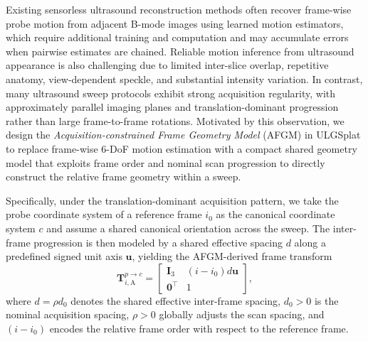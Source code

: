 Existing sensorless ultrasound reconstruction methods often recover
frame-wise probe motion from adjacent B-mode images using learned motion
estimators, which require additional training and computation and may
accumulate errors when pairwise estimates are chained. Reliable motion
inference from ultrasound appearance is also challenging due to limited
inter-slice overlap, repetitive anatomy, view-dependent speckle, and
substantial intensity variation. In contrast, many ultrasound sweep protocols
exhibit strong acquisition regularity, with approximately parallel imaging
planes and translation-dominant progression rather than large frame-to-frame
rotations. Motivated by this observation, we design the
\emph{Acquisition-constrained Frame Geometry Model} (AFGM) in ULGSplat to
replace frame-wise 6-DoF motion estimation with a compact shared geometry
model that exploits frame order and nominal scan progression to directly
construct the relative frame geometry within a sweep.

Specifically, under the translation-dominant acquisition pattern, we take the
probe coordinate system of a reference frame $i_0$ as the canonical coordinate
system $c$ and assume a shared canonical orientation across the sweep. The
inter-frame progression is then modeled by a shared effective spacing $d$
along a predefined signed unit axis $\mathbf u$, yielding the AFGM-derived
frame transform
\begin{equation}
\mathbf T_{i,\mathrm A}^{p\rightarrow c}
=
\begin{bmatrix}
\mathbf I_3 & (i-i_0)d\mathbf u\\
\mathbf 0^\top & 1
\end{bmatrix},
\label{eq:calibration-geometry-single}
\end{equation}
where $d=\rho d_0$ denotes the shared effective inter-frame spacing,
$d_0>0$ is the nominal acquisition spacing, $\rho>0$ globally adjusts the
scan spacing, and $(i-i_0)$ encodes the relative frame order with respect to
the reference frame. 

